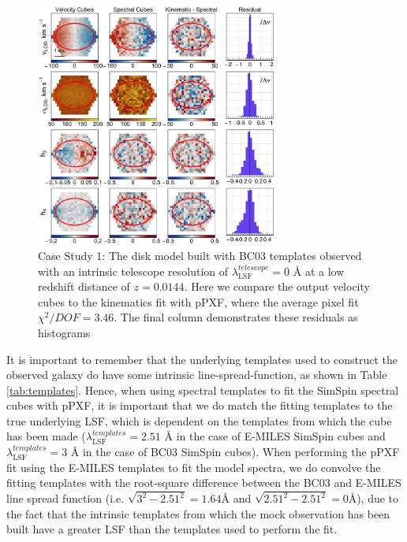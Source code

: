 \documentclass[
  journal=pasa,
  manuscript=research-paper, %
  year=2020,
  volume=37,
]{cup-journal}
\begin{document}
\begin{figure}
    \centering
    \includegraphics[keepaspectratio, width=8cm]{cs1_disk_velocities_lowz_BC03.jpeg}
    \caption{Case Study 1: The disk model built with BC03 templates observed with an intrinsic telescope resolution of  $\lambda_{\text{LSF}}^{telescope} = 0$ \AA{} at a low redshift distance of $z = 0.0144$. Here we compare the output velocity cubes to the kinematics fit with pPXF, where the average pixel fit $\chi^2/DOF = 3.46$. The final column demonstrates these residuals as histograms}
    \label{fig:cs1_disk_BC03}
\end{figure}

It is important to remember that the underlying templates used to construct the observed galaxy do have some intrinsic line-spread-function, as shown in Table \ref{tab:templates}.
Hence, when using spectral templates to fit the SimSpin spectral cubes with pPXF, it is important that we do match the fitting templates to the true underlying LSF, which is dependent on the templates from which the cube has been made ($\lambda_{\text{LSF}}^{templates} = 2.51$ \AA{} in the case of E-MILES SimSpin cubes and $\lambda_{\text{LSF}}^{templates} = 3$ \AA{} in the case of \textsc{BC03} SimSpin cubes). 
When performing the pPXF fit using the E-MILES templates to fit the model spectra, we do convolve the fitting templates with the root-square difference between the \textsc{BC03} and E-MILES line spread function (i.e. $\sqrt{3^{2} - 2.51^{2}} = 1.64$\AA{} and $\sqrt{2.51^{2} - 2.51^{2}} = 0$\AA), due to the fact that the intrinsic templates from which the mock observation has been built have a greater LSF than the templates used to perform the fit. 
\end{document}
